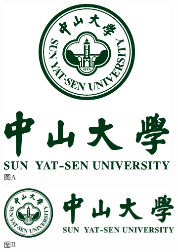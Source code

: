 \documentclass[../main]{subfiles}
\begin{document}
\begin{figure}[H]
    \centering
    \begin{subfigure}{0.3\textwidth}
        \centering
        \includegraphics[width=\linewidth]{figure/badge.pdf}
        \caption{图A}
        \label{fig:grid-a}
    \end{subfigure}
    \hfill
    \begin{subfigure}{0.3\textwidth}
        \centering
        \includegraphics[width=\linewidth]{figure/badge-horizonal.pdf}
        \caption{图B}
        \label{fig:grid-b}
    \end{subfigure}
    \hfill
    \begin{subfigure}{0.3\textwidth}
        \centering

\end{subfigure}
\end{figure}
\end{document}
